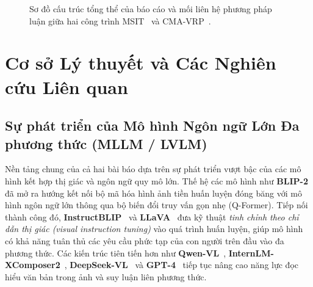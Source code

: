 \documentclass[conference,10pt]{IEEEtran}
\begin{document}
\begin{figure}[!t]
\caption{Sơ đồ cấu trúc tổng thể của báo cáo và mối liên hệ phương pháp luận giữa hai công trình MSIT~\cite{li2025msit} và CMA-VRP~\cite{li2025cmavrp}.}
\label{fig:overall_structure}
\end{figure}

\section{Cơ sở Lý thuyết và Các Nghiên cứu Liên quan}

\subsection{Sự phát triển của Mô hình Ngôn ngữ Lớn Đa phương thức (MLLM / LVLM)}

Nền tảng chung của cả hai bài báo dựa trên sự phát triển vượt bậc của các mô hình kết hợp thị giác và ngôn ngữ quy mô lớn. Thế hệ các mô hình như \textbf{BLIP-2}~\cite{li2023blip2} đã mở ra hướng kết nối bộ mã hóa hình ảnh tiền huấn luyện đóng băng với mô hình ngôn ngữ lớn thông qua bộ biến đổi truy vấn gọn nhẹ (Q-Former). Tiếp nối thành công đó, \textbf{InstructBLIP}~\cite{dai2023instructblip} và \textbf{LLaVA}~\cite{liu2023llava} đưa kỹ thuật \textit{tinh chỉnh theo chỉ dẫn thị giác (visual instruction tuning)} vào quá trình huấn luyện, giúp mô hình có khả năng tuân thủ các yêu cầu phức tạp của con người trên đầu vào đa phương thức. Các kiến trúc tiên tiến hơn như \textbf{Qwen-VL}~\cite{bai2023qwenvl}, \textbf{InternLM-XComposer2}~\cite{dong2024internlm}, \textbf{DeepSeek-VL}~\cite{lu2024deepseekvl} và \textbf{GPT-4}~\cite{openai2023gpt4} tiếp tục nâng cao năng lực đọc hiểu văn bản trong ảnh và suy luận liên phương thức.
\end{document}
